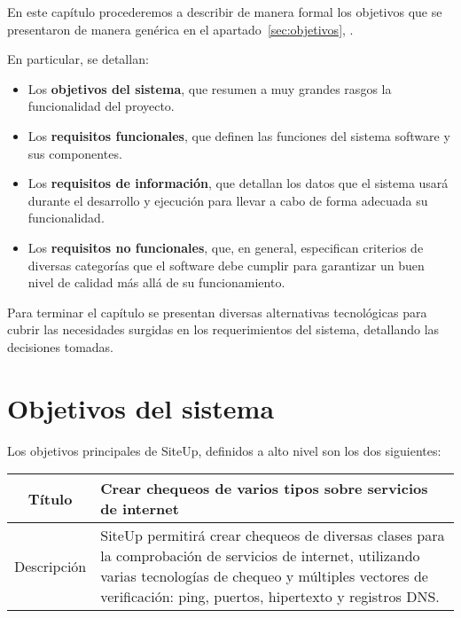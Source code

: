 
En este capítulo procederemos a describir de manera formal los objetivos que se
presentaron de manera genérica en el apartado~\ref{sec:objetivos},
\textit{}. 

En particular, se detallan:

\begin{itemize}
\item Los \textbf{objetivos del sistema}, que resumen a muy grandes rasgos la
  funcionalidad del proyecto.
\item Los \textbf{requisitos funcionales}, que definen las funciones del sistema
  software y sus componentes.
\item Los \textbf{requisitos de información}, que detallan los datos que el
  sistema usará durante el desarrollo y ejecución para llevar a cabo de forma
  adecuada su funcionalidad.
\item Los \textbf{requisitos no funcionales}, que, en general, especifican
  criterios de diversas categorías que el software debe cumplir para garantizar
  un buen nivel de calidad más allá de su funcionamiento.
\end{itemize}

Para terminar el capítulo se presentan diversas alternativas tecnológicas para
cubrir las necesidades surgidas en los requerimientos del sistema, detallando
las decisiones tomadas.


\section{Objetivos del sistema}

\renewcommand{\arraystretch}{1.5}

Los objetivos principales de SiteUp, definidos a alto nivel son los dos siguientes:

\begin{center}
  
  \begin{tabularx}{\textwidth}{|c|X|}
    \hline
    Título & Crear chequeos de varios tipos sobre servicios de internet \\

    \hline

    Descripción & SiteUp permitirá crear chequeos de diversas clases para la
    comprobación de servicios de internet, utilizando varias tecnologías de
    chequeo y múltiples vectores de verificación: ping, puertos, hipertexto y
    registros DNS. \\    

    \hline
  \end{tabularx}
\end{center}


